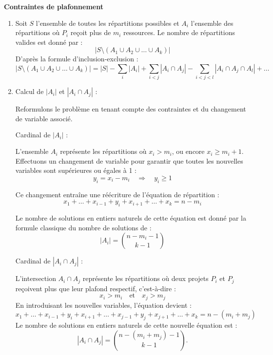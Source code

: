 \documentclass[10pt,a4paper]{article}
\begin{document}
\q \textbf{Contraintes de plafonnement}
   \begin{enumerate}

      \item Soit $S$ l'ensemble de toutes les répartitions possibles et $A_i$ l'ensemble des
      répartitions où $P_i$ reçoit plus de $m_i$ ressources. Le nombre de répartitions valides est
      donné par :
      $$
      |S \setminus (A_1 \cup A_2 \cup \dots \cup A_k)|
      $$
      D'après la formule d'inclusion-exclusion :
      $$
      |S \setminus (A_1 \cup A_2 \cup \dots \cup A_k)| = |S| - \sum_i |A_i| + \sum_{i<j} |A_i \cap A_j| - \sum_{i<j<l} |A_i \cap A_j \cap A_l| + \dots
      $$

      \item Calcul de $|A_i|$ et $|A_i \cap A_j|$ :

      Reformulons le problème en tenant compte des contraintes et du changement de variable associé.

      Cardinal de \( |A_i | \) :

      L'ensemble \( A_i \) représente les répartitions où \( x_i > m_i \), ou encore
      \( x_i \geq m_i+1 \).
      Effectuons un changement de variable pour garantir que toutes les nouvelles variables sont
      supérieures ou égales à 1 :
      \[
      y_i = x_i - m_i \quad \Rightarrow \quad y_i \geq 1
      \]

      Ce changement entraîne une réécriture de l'équation de répartition :
      \[
      x_1 + \dots + x_{i-1} + y_i + x_{i+1} + \dots + x_k = n - m_i
      \]

      Le nombre de solutions en entiers naturels de cette équation est donné par la formule
      classique du nombre de solutions de :
      \[
      |A_i| = \binom{n - m_i - 1}{k-1}
      \]

      Cardinal de \( |A_i \cap A_j| \) :

      L'intersection \( A_i \cap A_j \) représente les répartitions où deux projets \( P_i \) et \(
      P_j \) reçoivent plus que leur plafond respectif, c'est-à-dire :
      \[
      x_i > m_i \quad \text{et} \quad x_j > m_j
      \]
      En introduisant les nouvelles variables, l'équation devient :
      \[
      x_1 + \dots + x_{i-1} + y_i + x_{i+1} + \dots + x_{j-1} + y_j + x_{j+1} + \dots + x_k = n - (m_i + m_j)
      \]
      Le nombre de solutions en entiers naturels de cette nouvelle équation est :
      \[
      |A_i \cap A_j| = \binom{n - (m_i + m_j) - 1}{k-1}.
      \]


\end{enumerate}
\end{document}
